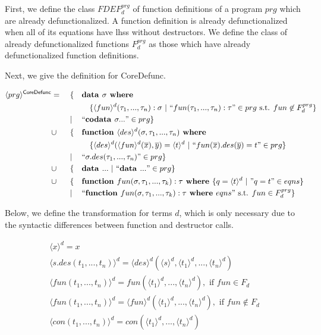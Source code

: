 \begin{algorithm}

First, we define the class $FDEF^{prg}_d$ of function definitions of a program $prg$ which are already defunctionalized. A function definition is already defunctionalized when all of its equations have lhss without destructors. We define the class of already defunctionalized functions $F^{prg}_d$ as those which have already defunctionalized function definitions.

Next, we give the definition for \textsf{CoreDefunc}.

\begin{align*}
\langle prg \rangle^{\textsf{CoreDefunc}} & = ~&& \{ && \textrm{\textbf{data }} \sigma \textrm{\textbf{ where }} \span\span\span\span \\
& && && && \{ \langle fun \rangle^d (\tau_1, ..., \tau_n): \sigma ~ | ~ `` fun(\tau_1, ..., \tau_n): \tau " \in prg \text{ s.t. } fun \not\in F^{prg}_d \} \\
& && | && `` \textrm{\textbf{codata }} \sigma ... " \in prg \} \span\span\span\span \\
& \cup && \{ && \textrm{\textbf{function }} \langle des \rangle^d (\sigma, \tau_1, ..., \tau_n) \textrm{\textbf{ where}} \span\span\span\span \\
& && && && \{ \langle des \rangle^d (\langle fun \rangle^d (\overline{x}), \overline{y}) = \langle t \rangle^d ~ | ~ `` fun(\overline{x}).des(\overline{y}) = t " \in prg \} \\
& && | && `` \sigma.des(\tau_1, ..., \tau_n) " \in prg \} \span\span\span\span \\
& \cup && \{ && \textrm{\textbf{data }} ... ~ | ~ `` \textrm{\textbf{data }} ... " \in prg \} \span\span\span\span \\
& \cup && \{ && \textrm{\textbf{function }} fun(\sigma, \tau_1, ..., \tau_k): \tau \textrm{\textbf{ where }} \{ q = \langle t \rangle^d ~ | ~ "q = t" \in eqns \} \span\span\span\span \\
& && | && `` \textrm{\textbf{function }} fun(\sigma, \tau_1, ..., \tau_k): \tau \textrm{\textbf{ where }} eqns " \text{ s.t. } fun \in F^{prg}_d \} \span\span\span\span
\end{align*}

Below, we define the transformation for terms $d$, which is only necessary due to the syntactic differences between function and destructor calls.

\begin{align*}
\langle x \rangle^d = x \\
\langle s.des(t_1, ..., t_n) \rangle^d = \langle des \rangle^d (\langle s \rangle^d, \langle t_1 \rangle^d, ..., \langle t_n \rangle^d) \\
\langle fun(t_1, ..., t_n) \rangle^d = fun(\langle t_1 \rangle^d, ..., \langle t_n \rangle^d), \text{ if } fun \in F_d \\
\langle fun(t_1, ..., t_n) \rangle^d = \langle fun \rangle^d (\langle t_1 \rangle^d, ..., \langle t_n \rangle^d), \text{ if } fun \not\in F_d \\
\langle con(t_1, ..., t_n) \rangle^d = con(\langle t_1 \rangle^d, ..., \langle t_n \rangle^d)
\end{align*}


\end{algorithm}
